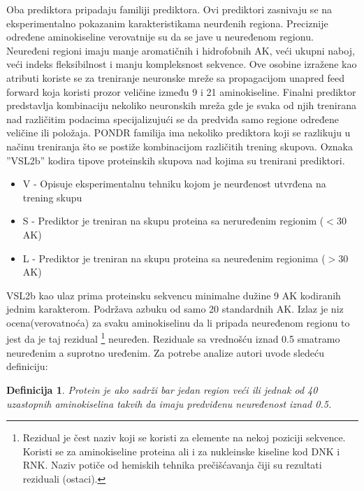 Oba prediktora pripadaju   familiji prediktora. Ovi prediktori zasnivaju se na eksperimentalno
pokazanim karakteristikama neurđenih regiona. Preciznije određene aminokiseline
verovatnije su da se jave u neuređenom regionu. Neuređeni regioni imaju manje
aromatičnih i hidrofobnih AK, veći ukupni naboj, veći indeks fleksibilnost i
manju kompleksnost sekvence. Ove osobine izražene kao atributi koriste se za
treniranje neuronske mreže  sa propagacijom unapred \en
{feed forward} koja koristi prozor veličine između 9 i 21 aminokiseline.
Finalni prediktor predstavlja kombinaciju nekoliko neuronskih mreža gde je
svaka od njih trenirana nad različitim podacima specijalizujući se da predviđa
samo regione određene veličine ili položaja. PONDR familija ima nekoliko
prediktora koji  se razlikuju u načinu treniranja što se postiže kombinacijom
različitih trening skupova.  Oznaka ''VSL2b'' kodira tipove proteinskih skupova
nad kojima su trenirani prediktori.
\begin{itemize}
  \item V - Opisuje eksperimentalnu tehniku kojom je neurđenost utvrđena na
    trening skupu 
  \item S - Prediktor je treniran na skupu proteina sa 
      neruređenim
    regionim ($<30$ AK)
  \item L - Prediktor je treniran na skupu proteina sa 
    neuređenim regionima ($>30$ AK)
\end{itemize}

VSL2b kao ulaz prima proteinsku sekvencu minimalne dužine 9 AK kodiranih jednim
karakterom. Podržava azbuku od samo 20 standardnih AK.  Izlaz je niz
ocena(verovatnoća) za svaku aminokiselinu da li pripada neuređenom regionu to
jest da je taj rezidual
\footnote{ Rezidual je čest naziv koji se koristi za elemente na nekoj
  poziciji sekvence.  Koristi se za aminokiseline  proteina ali i za nukleinske
  kiseline kod DNK i RNK.  Naziv potiče od hemiskih tehnika prečišćavanja čiji
  su rezultati reziduali (ostaci).
} neuređen. Reziduale sa vrednošću iznad 0.5 smatramo neuređenim a suprotno
uređenim. Za potrebe analize autori uvode sledeću definiciju:\\

\newtheorem{mydef}{Definicija}
\begin{mydef}
\label{pdis_def}
Protein je   ako
sadrži bar jedan region veći ili jednak od 40 uzastopnih aminokiselina
takvih da imaju \textit{predviđenu neuređenost} iznad 0.5. \\
\end{mydef}

